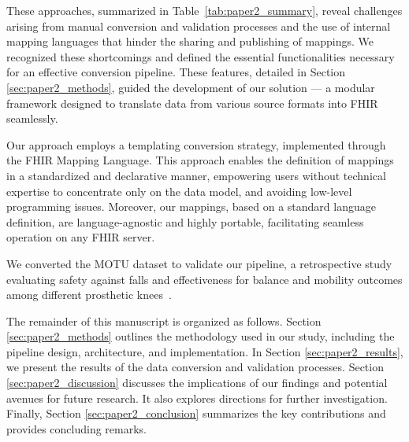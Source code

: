 These approaches, summarized in Table~\ref{tab:paper2_summary}, reveal challenges arising from manual conversion and validation processes and the use of internal mapping languages that hinder the sharing and publishing of mappings. We recognized these shortcomings and defined the essential functionalities necessary for an effective conversion pipeline. These features, detailed in Section \ref{sec:paper2_methods}, guided the development of our solution — a modular framework designed to translate data from various source formats into FHIR seamlessly.

Our approach employs a templating conversion strategy, implemented through the FHIR Mapping Language. This approach enables the definition of mappings in a standardized and declarative manner, empowering users without technical expertise to concentrate only on the data model, and avoiding low-level programming issues. Moreover, our mappings, based on a standard language definition, are language-agnostic and highly portable, facilitating seamless operation on any FHIR server. 

We converted the MOTU dataset to validate our pipeline, a retrospective study evaluating safety against falls and effectiveness for balance and mobility outcomes among different prosthetic knees~\cite{arcobelli_motu_2023}. 

The remainder of this manuscript is organized as follows.
Section \ref{sec:paper2_methods} outlines the methodology used in our study, including the pipeline design, architecture, and implementation.
In Section \ref{sec:paper2_results}, we present the results of the data conversion and validation processes.
Section \ref{sec:paper2_discussion} discusses the implications of our findings and potential avenues for future research. It also explores directions for further investigation.
Finally, Section \ref{sec:paper2_conclusion} summarizes the key contributions and provides concluding remarks.

